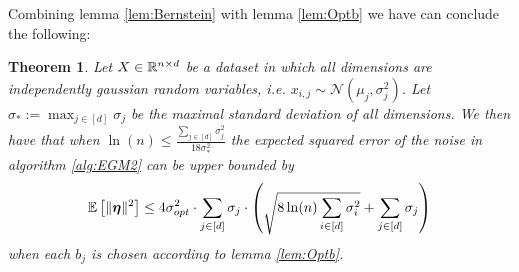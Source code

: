 \documentclass[a4paper,12pt]{article}
\newtheorem{theorem}{Theorem}
\begin{document}
\noindent Combining lemma \ref{lem:Bernstein} with lemma \ref{lem:Optb} 
we have can conclude the following:

\begin{theorem}
\label{theo:Alg3OptErr}
Let $X \in \mathbb{R}^{n \times d}$ be a dataset in which all dimensions are independently gaussian random variables, i.e. $x_{i,j} \sim \mathcal{N}(\mu_j, \sigma_j^2)$. 
Let $\sigma_* := \max_{j \in [d]} \sigma_j$ be the maximal standard deviation of all dimensions. We then have that
when $\ln (n) \le \frac{\sum_{j \in [d]} \sigma_j^2}{18 \sigma_*^2}$ 
the expected squared error of the noise in algorithm \ref{alg:EGM2} can be upper bounded by 
\[
    \mathbb{E} \left [ \| \bm{\eta} \|^2 \right] \le 4\sigma_{opt}^2  \cdot \sum_{j \in [d]} \sigma_j \cdot
    \left ( \sqrt{8\ln(n) \sum_{i \in [d]} \sigma_i^2} + \sum_{j \in [d]} \sigma_j \right)
\]
when each $b_j$ is chosen according to lemma \ref{lem:Optb}.
\end{theorem}
\end{document}
